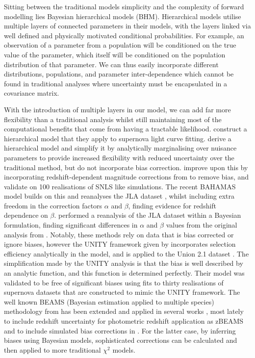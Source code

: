 \documentclass[a4paper,fleqn,usenatbib]{mnras}
\newcommand{\green}{\color{forestgreen}}
\begin{document}
Sitting between the traditional models simplicity and the complexity of forward modelling lies Bayesian hierarchical models (BHM). Hierarchical models utilise multiple layers of connected parameters in their models, with the layers linked via well defined and {\green physically} motivated conditional probabilities. For example, an observation of a parameter from a population will be conditioned on the true value of the parameter, which itself will be conditioned on the population distribution of that parameter. We can thus easily incorporate different distributions, populations, and parameter inter-dependence which cannot be found in traditional analyses where uncertainty must be encapsulated in a covariance matrix.

With the introduction of multiple layers in our model, we can add far more flexibility than a traditional analysis whilst still maintaining most of the computational benefits that come from having a tractable likelihood. \citet{Mandel2009, Mandel2011a, Mandel2017} construct a hierarchical model that they apply to supernova light curve fitting. \citet{March2011} derive a hierarchical model and simplify it by analytically marginalising over nuisance parameters to provide increased flexibility with reduced uncertainty over the traditional method, but do not incorporate bias correction. \citet{March2014, Karpenka2015} improve upon this by incorporating redshift-dependent magnitude corrections from \citet{Perrett2010} to remove bias, and validate on 100 realisations of SNLS like simulations. The recent BAHAMAS model \citep{Shariff2016} builds on this and reanalyses the JLA dataset \citep[using redshift dependent bias corrections from][]{Betoule2014}, whilst including extra freedom in the correction factors $\alpha$ and $\beta$, finding evidence for redshift dependence on $\beta$. \citet{Ma2016} performed a reanalysis of the JLA dataset within a Bayesian formulation, finding significant differences in $\alpha$ and $\beta$ values from the original analysis from \citet{Betoule2014}. Notably, these methods rely on data that is bias corrected or ignore biases, however the UNITY framework given by \citet{Rubin2015} incorporates selection efficiency analytically in the model, and is applied to the Union 2.1 dataset \citep{Suzuki2012}. The simplification made by the UNITY analysis is that the bias is well described by an analytic function, and this function is determined perfectly. Their model was validated to be free of significant biases using fits to {\green thirty realisations of supernova datasets that are constructed to mimic the UNITY framework}. The well known BEAMS (Bayesian estimation applied to multiple species) methodology from \citet{Kunz2007} has been extended and applied in several works \citep{Hlozek2012}, most lately to include redshift uncertainty for photometric redshift application as zBEAMS \citep{Roberts2017} and to include simulated bias corrections in \citet{Kessler2017}. For the latter case, by inferring biases using Bayesian models, sophisticated corrections can be calculated and then applied to more traditional $\chi^2$ models.
\end{document}
